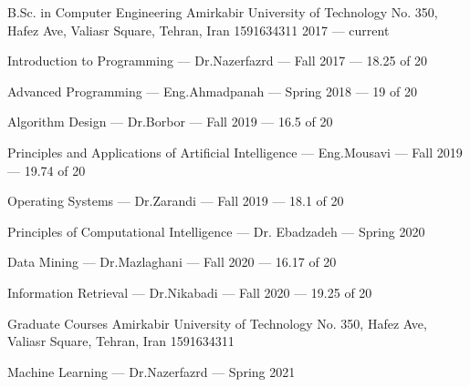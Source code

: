 

\begin{cventries}

  \cventry
    {B.Sc. in Computer Engineering} %
    {Amirkabir University of Technology} %
    {No. 350, Hafez Ave, Valiasr Square, Tehran, Iran 1591634311} %
    {2017 --- current} %
    {
        \begin{cvitems}
            \item Introduction to Programming --- Dr.Nazerfazrd --- Fall 2017 --- 18.25 of 20
            \item Advanced Programming --- Eng.Ahmadpanah --- Spring 2018 --- 19 of 20
            \item Algorithm Design --- Dr.Borbor --- Fall 2019 --- 16.5 of 20
            \item Principles and Applications of Artificial Intelligence --- Eng.Mousavi --- Fall 2019 --- 19.74 of 20
            \item Operating Systems --- Dr.Zarandi --- Fall 2019 --- 18.1 of 20
            \item Principles of Computational Intelligence --- Dr. Ebadzadeh --- Spring 2020
            \item Data Mining --- Dr.Mazlaghani --- Fall 2020 --- 16.17 of 20 
            \item Information Retrieval --- Dr.Nikabadi --- Fall 2020 --- 19.25 of 20
        \end{cvitems}
    }
    
    \cventry
    {Graduate Courses} %
    {Amirkabir University of Technology} %
    {No. 350, Hafez Ave, Valiasr Square, Tehran, Iran 1591634311} %
    {} %
    {
        \begin{cvitems}
            \item Machine Learning --- Dr.Nazerfazrd --- Spring 2021
        \end{cvitems}
    }

\end{cventries}

